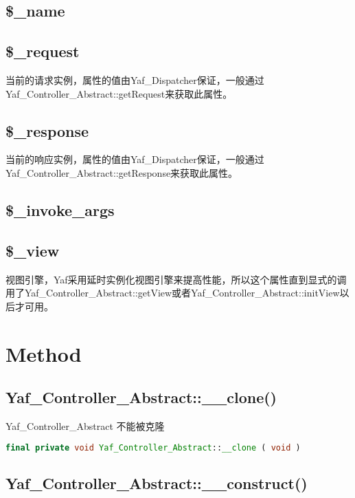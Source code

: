 \subsection{\$\_name}



\subsection{\$\_request}

当前的请求实例，属性的值由Yaf\_Dispatcher保证，一般通过Yaf\_Controller\_Abstract::getRequest来获取此属性。


\subsection{\$\_response}

当前的响应实例，属性的值由Yaf\_Dispatcher保证，一般通过Yaf\_Controller\_Abstract::getResponse来获取此属性。


\subsection{\$\_invoke\_args}



\subsection{\$\_view}

视图引擎，Yaf采用延时实例化视图引擎来提高性能，所以这个属性直到显式的调用了Yaf\_Controller\_Abstract::getView或者Yaf\_Controller\_Abstract::initView以后才可用。




\section{Method}


\subsection{Yaf\_Controller\_Abstract::\_\_clone()}


Yaf\_Controller\_Abstract 不能被克隆


\begin{lstlisting}[language=PHP]
final private void Yaf_Controller_Abstract::__clone ( void )
\end{lstlisting}


\subsection{Yaf\_Controller\_Abstract::\_\_construct()}

